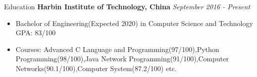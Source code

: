 \documentclass{resume} %
\begin{document}

\begin{rSection}{Education}
{\bf Harbin Institute of Technology, China} \hfill {\em September 2016 - Present} 
    \begin{itemize}[itemsep=-0.3em]
        \item Bachelor of Engineering(Expected 2020) in Computer Science and Technology\hfill { GPA: 83/100 }
        \item Courses: Advanced C Language and Programming(97/100),Python Programming(98/100),Java Network Programming(91/100),Computer Networks(90.1/100),Computer System(87.2/100) etc.
    \end{itemize}
\end{rSection}
\end{document}

